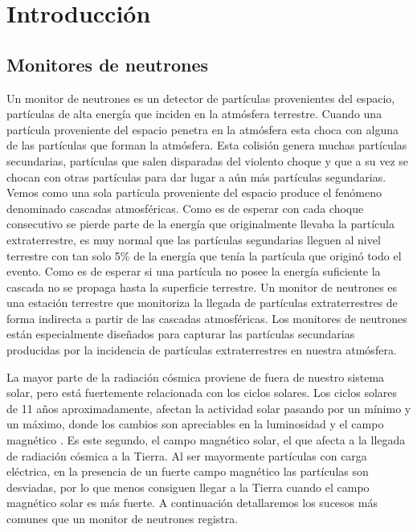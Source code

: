 \chapter{Introducción}
\label{cap1}

\section{Monitores de neutrones}
	Un monitor de neutrones es un detector de partículas provenientes del espacio, partículas de alta energía que inciden en la atmósfera
	terrestre.  Cuando una partícula proveniente del espacio penetra en la atmósfera esta choca con alguna de las partículas que forman la
	atmósfera.  Esta colisión genera muchas partículas secundarias, partículas que salen disparadas del violento choque y que a su vez se chocan
	con otras partículas para dar lugar a aún más partículas segundarias. Vemos como una sola partícula proveniente del espacio produce el
	fenómeno denominado cascadas atmosféricas. Como es de esperar con cada choque consecutivo se pierde parte de la energía que originalmente
	llevaba la partícula extraterrestre, es muy normal que las partículas segundarias lleguen al nivel terrestre con tan solo 5\% de la energía
	que tenía la partícula que originó todo el evento. Como es de esperar si una partícula no posee la energía suficiente la cascada no se propaga
	hasta la superficie terrestre. Un monitor de neutrones es una estación terrestre que monitoriza la llegada de partículas extraterrestres de
	forma indirecta a partir de las cascadas atmosféricas. Los monitores de neutrones están especialmente diseñados para capturar las partículas
	secundarias producidas por la incidencia de partículas extraterrestres en nuestra atmósfera.
	\par
	La mayor parte de la radiación cósmica proviene de fuera de nuestro sistema solar, pero está fuertemente relacionada con los ciclos solares.
	Los ciclos solares de 11 años aproximadamente, afectan la actividad solar pasando por un mínimo y un máximo, donde los cambios son apreciables
	en la luminosidad y el campo magnético \cite{SolarCicleWiki}. Es este segundo, el campo magnético solar, el que afecta a la llegada de
	radiación cósmica a la Tierra. Al ser mayormente partículas con carga eléctrica, en la presencia de un fuerte campo magnético las partículas
	son desviadas, por lo que menos consiguen llegar a la Tierra cuando el campo magnético solar es más fuerte. A continuación detallaremos los
	sucesos más comunes que un monitor de neutrones registra. 
